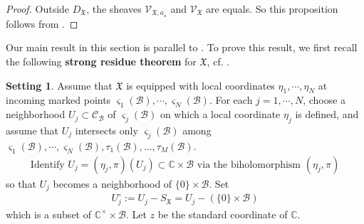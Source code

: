 \documentclass[11pt,b5paper,notitlepage]{article}
\theoremstyle{definition}
\newtheorem{rem}[df]{Remark}
\newtheorem{sett}[df]{Setting}
\theoremstyle{plain}
\newcommand{\fk}{\mathfrak}
\newcommand{\mc}{\mathcal}
\newcommand{\SV}{\mathscr{V}}
\newcommand{\scr}{\mathscr}
\newcommand{\DX}{D_{\fk X}}
\newcommand{\Vbb}{\mathbb V}
\newcommand{\Wbb}{\mathbb W}
\newcommand{\Cbb}{\mathbb C}
\newcommand{\<}{\left\langle}
\renewcommand{\>}{\right\rangle}
\newcommand{\MC}{\mathcal{C}}
\newcommand{\MB}{\mathcal{B}}
\newcommand{\fx}{\mathfrak{X}}
\newcommand{\SW}{\mathscr{W}}
\numberwithin{equation}{section}
\begin{document}
\begin{proof}
Outside $\DX$, the sheaves $\scr V_{\fk X,a_\star}$ and $\scr V_{\fk X}$ are equals. So this proposition follows from \cite[Prop. 6.2]{Gui-propagation}.  %
\end{proof} 
\begin{comment}
\begin{rem}
   Since 
   $$
   \SV_{\fx,a_1,\cdots,a_M}\otimes \pi^*\SW_\fx(\Wbb)\simeq \SV_{\fx,a_1,\cdots,a_M}\otimes_\Cbb \SW_\fx(\Wbb),
   $$
   we can use
   $$
   \SW_{\wr\fx}(\Vbb\otimes \Wbb)\simeq \SV_{\fx,a_1,\cdots,a_M}\vert_{\MC-S_\fx}\otimes_\Cbb \SW_\fx(\Wbb)
   $$
   instead of Prop. \ref{equivalence3}.
\end{rem}
\end{comment}

Our main result in this section is parallel to \cite[Thm. 7.1]{Gui-propagation}. %
To prove this result, we first  recall the following \textbf{strong residue theorem} for $\fk X$, cf. \cite[Thm. A.1]{Gui-propagation}. 


\begin{sett}\label{lb12}
Assume that $\fx$ is equipped with local coordinates $\eta_1,\cdots,\eta_N$ at incoming marked points $\varsigma_1(\MB),\cdots,\varsigma_N(\MB)$. For each $j=1,\cdots, N$, choose a neighborhood $U_j\subset \MC_{\MB}$ of $\varsigma_j(\MB)$ on which a local coordinate $\eta_j$ is defined, and assume that $U_j$ intersects only $\varsigma_j(\MB)$ among $\varsigma_1(\MB),\cdots,\varsigma_N(\MB),\tau_1(\mc B),\dots,\tau_M(\mc B)$. 
\begin{gather}
\text{Identify $U_j=(\eta_j,\pi)(U_j)\subset \Cbb\times \MB$ via the biholomorphism $(\eta_j,\pi)$}
\end{gather}
so that $U_j$ becomes a neighborhood of $\{0\}\times \MB$. Set
\begin{align}
U_j^\circ:=U_j-S_\fx=U_j-(\{0\}\times \MB)
\end{align}
which is a subset of $\Cbb^\times \times \MB$. Let $z$ be the standard coordinate of $\Cbb$.
\end{sett}
\end{document}
